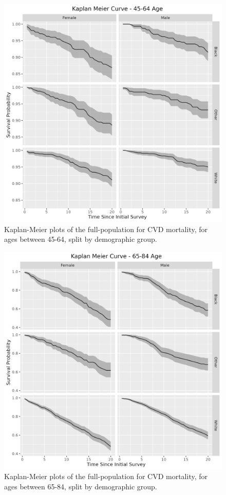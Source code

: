 \documentclass[
]{article}
\begin{document}
\begin{figure}
\centering
\includegraphics{./Rmarkdown_Plots/SurvProbKM_45-64.png}
\caption{Kaplan-Meier plots of the full-population for CVD mortality, for ages between 45-64, split by demographic group.}\label{fig:KM45tot}
\end{figure}

\begin{figure}
\centering
\includegraphics{./Rmarkdown_Plots/SurvProbKM_65-84.png}
\caption{Kaplan-Meier plots of the full-population for CVD mortality, for ages between 65-84, split by demographic group.}\label{fig:KM65tot}
\end{figure}
\end{document}
